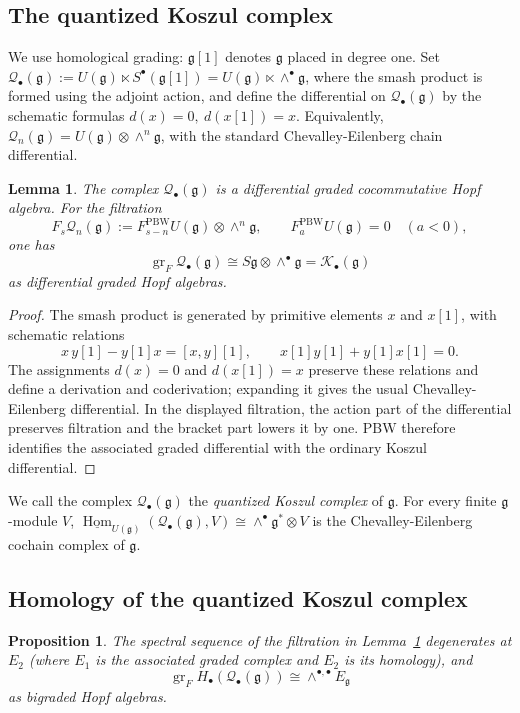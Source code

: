 \documentclass[12pt]{amsart}
\newtheorem{proposition}[theorem]{Proposition}
\newtheorem{lemma}[theorem]{Lemma}
\theoremstyle{remark}
\DeclareMathOperator{\Hom}{Hom}
\DeclareMathOperator{\gr}{gr}
\newcommand{\g}{\mathfrak g}
\newcommand{\uHom}{\underline{\Hom}}
\newcommand{\cK}{\mathcal K}
\newcommand{\cQ}{\mathcal Q}
\begin{document}
\subsection{The quantized Koszul complex}\label{sec:quantized-koszul}

We use homological grading: $\g[1]$ denotes $\g$ placed in degree one.
Set $\cQ_\bullet(\g):=U(\g)\ltimes S^\bullet (\g[1])=U(\g)\ltimes \wedge^\bullet \g$, where the smash product is formed using the adjoint action, and define the differential 
on $\cQ_\bullet(\g)$ by the schematic formulas
$d(x)=0,\ d(x[1])=x$. 
Equivalently, $\cQ_n(\g)=U(\g)\otimes\wedge^n\g$,
with the standard Chevalley-Eilenberg chain differential.

\begin{lemma}\label{lem:quantized-koszul}
The complex $\cQ_\bullet(\g)$ is a differential graded cocommutative Hopf
algebra.  For the filtration
\[
 F_s\cQ_n(\g):=
 F^{\mathrm{PBW}}_{s-n}U(\g)\otimes\wedge^n\g,
 \qquad F^{\mathrm{PBW}}_aU(\g)=0\quad(a<0),
\]
one has
\[
 \gr_F\cQ_\bullet(\g)\cong
 S\g\otimes\wedge^\bullet\g=\cK_\bullet(\g)
\]
as differential graded Hopf algebras.
\end{lemma}

\begin{proof}
The smash product is generated by primitive elements $x$ and $x[1]$, with schematic
relations
\[
 x\,y[1]-y[1]x=[x,y][1],
 \qquad x[1]y[1]+y[1]x[1]=0.
\]
The assignments $d(x)=0$ and $d(x[1])=x$ preserve these relations and define
a derivation and coderivation; expanding it gives the usual
Chevalley-Eilenberg differential.  In the displayed filtration, the action
part of the differential preserves filtration and the bracket part lowers it
by one.  PBW therefore identifies the associated graded differential with
the ordinary Koszul differential.
\end{proof}

We call the complex $\cQ_\bullet(\g)$ the {\it quantized Koszul complex} of $\g$. For every finite $\g$-module $V$, 
$\uHom_{U(\g)}(\cQ_\bullet(\g),V)
 \cong\wedge^\bullet\g^*\otimes V$
is the Chevalley-Eilenberg cochain complex of $\g$. 

\subsection{Homology of the quantized Koszul complex}

\begin{proposition}\label{prop:degeneration}
The spectral sequence of the filtration in
Lemma~\ref{lem:quantized-koszul} degenerates at $E_2$ (where $E_1$ is the associated graded complex and $E_2$ is its homology), and
\[
 \gr_F H_\bullet(\cQ_\bullet(\g))\cong\wedge^{\bullet,\bullet} E_\g
\]
as bigraded Hopf algebras.
\end{proposition}
\end{document}
